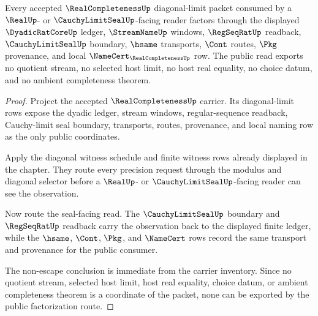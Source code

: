 \begin{theorem}
\label{thm:real-completeness-diagonal-seal-factorization-public-boundary}
Every accepted $\RealCompletenessUp$ diagonal-limit packet consumed by a $\RealUp$- or $\CauchyLimitSealUp$-facing reader factors through the displayed $\DyadicRatCoreUp$ ledger, $\StreamNameUp$ windows, $\RegSeqRatUp$ readback, $\CauchyLimitSealUp$ boundary, $\hsame$ transports, $\Cont$ routes, $\Pkg$ provenance, and local $\NameCert_{\RealCompletenessUp}$ row. The public read exports no quotient stream, no selected host limit, no host real equality, no choice datum, and no ambient completeness theorem.
\end{theorem}
\begin{proof}
Project the accepted $\RealCompletenessUp$ carrier. Its diagonal-limit rows expose the dyadic ledger, stream windows, regular-sequence readback, Cauchy-limit seal boundary, transports, routes, provenance, and local naming row as the only public coordinates.

Apply the diagonal witness schedule and finite witness rows already displayed in the chapter. They route every precision request through the modulus and diagonal selector before a $\RealUp$- or $\CauchyLimitSealUp$-facing reader can see the observation.

Now route the seal-facing read. The $\CauchyLimitSealUp$ boundary and $\RegSeqRatUp$ readback carry the observation back to the displayed finite ledger, while the $\hsame$, $\Cont$, $\Pkg$, and $\NameCert$ rows record the same transport and provenance for the public consumer.

The non-escape conclusion is immediate from the carrier inventory. Since no quotient stream, selected host limit, host real equality, choice datum, or ambient completeness theorem is a coordinate of the packet, none can be exported by the public factorization route.
\end{proof}

